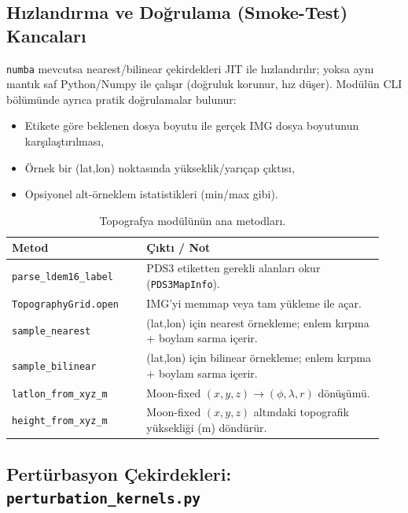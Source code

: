 \subsection*{Hızlandırma ve Doğrulama (Smoke-Test) Kancaları}
\texttt{numba} mevcutsa nearest/bilinear çekirdekleri JIT ile hızlandırılır; yoksa aynı mantık saf Python/Numpy ile çalışır
(doğruluk korunur, hız düşer).
Modülün CLI bölümünde ayrıca pratik doğrulamalar bulunur:
\begin{itemize}
  \item Etikete göre beklenen dosya boyutu ile gerçek IMG dosya boyutunun karşılaştırılması,
  \item Örnek bir (lat,lon) noktasında yükseklik/yarıçap çıktısı,
  \item Opsiyonel alt-örneklem istatistikleri (min/max gibi).
\end{itemize}

\begin{table}[H]
\centering
\caption{Topografya modülünün ana metodları.}
\begin{tabular}{p{0.34\linewidth} p{0.60\linewidth}}
\hline
\textbf{Metod} & \textbf{Çıktı / Not} \\
\hline
\texttt{parse\_ldem16\_label} & PDS3 etiketten gerekli alanları okur (\texttt{PDS3MapInfo}). \\
\texttt{TopographyGrid.open} & IMG’yi memmap veya tam yükleme ile açar. \\
\texttt{sample\_nearest} & (lat,lon) için nearest örnekleme; enlem kırpma + boylam sarma içerir. \\
\texttt{sample\_bilinear} & (lat,lon) için bilinear örnekleme; enlem kırpma + boylam sarma içerir. \\
\texttt{latlon\_from\_xyz\_m} & Moon-fixed \((x,y,z)\rightarrow(\phi,\lambda,r)\) dönüşümü. \\
\texttt{height\_from\_xyz\_m} & Moon-fixed \((x,y,z)\) altındaki topografik yüksekliği (m) döndürür. \\
\hline
\end{tabular}
\end{table}



\newpage
\subsection{Pertürbasyon Çekirdekleri: \texttt{perturbation\_kernels.py}}
\label{subsec:perturbation_kernels}

